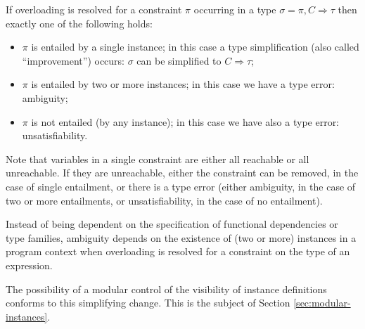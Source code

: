 If overloading is resolved for a constraint $\pi$ occurring in a type
$\sigma = \pi,C \Rightarrow \tau$ then exactly one of the following
holds:
\begin{itemize}

\item $\pi$ is entailed by a single instance; in this case a type
  simplification (also called ``improvement'') occurs: $\sigma$ can be
  simplified to $C \Rightarrow \tau$;

\item $\pi$ is entailed by two or more instances; in this case we have
  a type error: ambiguity;

\item $\pi$ is not entailed (by any instance); in this case we have also
  a type error: unsatisfiability.

\end{itemize}

Note that variables in a single constraint are either all reachable or
all unreachable. If they are unreachable, either the constraint can be
removed, in the case of single entailment, or there is a type error
(either ambiguity, in the case of two or more entailments, or
unsatisfiability, in the case of no entailment).

Instead of being dependent on the specification of functional
dependencies or type families, ambiguity depends on the existence of
(two or more) instances in a program context when overloading is
resolved for a constraint on the type of an expression.

The possibility of a modular control of the visibility of instance
definitions conforms to this simplifying change. This is the subject
of Section \ref{sec:modular-instances}. 
